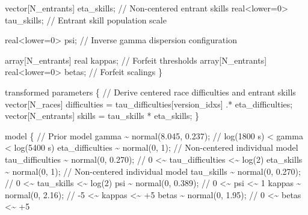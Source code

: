 \documentclass[
  letterpaper,
  DIV=11,
  numbers=noendperiod]{scrartcl}
\newenvironment{Shaded}{\begin{snugshade}}{\end{snugshade}}
\newcommand{\CommentTok}[1]{\textcolor[rgb]{0.37,0.37,0.37}{#1}}
\newcommand{\DataTypeTok}[1]{\textcolor[rgb]{0.68,0.00,0.00}{#1}}
\newcommand{\DecValTok}[1]{\textcolor[rgb]{0.68,0.00,0.00}{#1}}
\newcommand{\FloatTok}[1]{\textcolor[rgb]{0.68,0.00,0.00}{#1}}
\newcommand{\KeywordTok}[1]{\textcolor[rgb]{0.00,0.23,0.31}{#1}}
\newcommand{\NormalTok}[1]{\textcolor[rgb]{0.00,0.23,0.31}{#1}}
\begin{document}
\begin{codelisting}
\begin{Shaded}
\begin{Highlighting}[]
  \DataTypeTok{vector}\NormalTok{[N\_entrants] eta\_skills;    }\CommentTok{// Non{-}centered entrant skills}
  \DataTypeTok{real}\NormalTok{\textless{}}\KeywordTok{lower}\NormalTok{=}\DecValTok{0}\NormalTok{\textgreater{} tau\_skills;         }\CommentTok{// Entrant skill population scale}

  \DataTypeTok{real}\NormalTok{\textless{}}\KeywordTok{lower}\NormalTok{=}\DecValTok{0}\NormalTok{\textgreater{} psi;                }\CommentTok{// Inverse gamma dispersion configuration}

  \DataTypeTok{array}\NormalTok{[N\_entrants] }\DataTypeTok{real}\NormalTok{ kappas;         }\CommentTok{// Forfeit thresholds}
  \DataTypeTok{array}\NormalTok{[N\_entrants] }\DataTypeTok{real}\NormalTok{\textless{}}\KeywordTok{lower}\NormalTok{=}\DecValTok{0}\NormalTok{\textgreater{} betas; }\CommentTok{// Forfeit scalings}
\NormalTok{\}}

\KeywordTok{transformed parameters}\NormalTok{ \{}
  \CommentTok{// Derive centered race difficulties and entrant skills}
  \DataTypeTok{vector}\NormalTok{[N\_races] difficulties}
\NormalTok{    = tau\_difficulties[version\_idxs] .* eta\_difficulties;}
  \DataTypeTok{vector}\NormalTok{[N\_entrants] skills}
\NormalTok{    = tau\_skills * eta\_skills;}
\NormalTok{\}}

\KeywordTok{model}\NormalTok{ \{}
  \CommentTok{// Prior model}
\NormalTok{  gamma \textasciitilde{} normal(}\FloatTok{8.045}\NormalTok{, }\FloatTok{0.237}\NormalTok{); }\CommentTok{// log(1800 s) \textless{} gamma \textless{} log(5400 s)}
\NormalTok{  eta\_difficulties \textasciitilde{} normal(}\DecValTok{0}\NormalTok{, }\DecValTok{1}\NormalTok{);     }\CommentTok{// Non{-}centered individual model}
\NormalTok{  tau\_difficulties \textasciitilde{} normal(}\DecValTok{0}\NormalTok{, }\FloatTok{0.270}\NormalTok{); }\CommentTok{// 0 \textless{}\textasciitilde{} tau\_difficulties \textless{}\textasciitilde{} log(2)}
\NormalTok{  eta\_skills \textasciitilde{} normal(}\DecValTok{0}\NormalTok{, }\DecValTok{1}\NormalTok{);           }\CommentTok{// Non{-}centered individual model}
\NormalTok{  tau\_skills \textasciitilde{} normal(}\DecValTok{0}\NormalTok{, }\FloatTok{0.270}\NormalTok{);       }\CommentTok{// 0 \textless{}\textasciitilde{}    tau\_skills    \textless{}\textasciitilde{} log(2)}
\NormalTok{  psi \textasciitilde{} normal(}\DecValTok{0}\NormalTok{, }\FloatTok{0.389}\NormalTok{);       }\CommentTok{// 0 \textless{}\textasciitilde{} psi \textless{}\textasciitilde{} 1}
\NormalTok{  kappas \textasciitilde{} normal(}\DecValTok{0}\NormalTok{, }\FloatTok{2.16}\NormalTok{);     }\CommentTok{// {-}5 \textless{}\textasciitilde{} kappas \textless{}\textasciitilde{} +5}
\NormalTok{  betas \textasciitilde{} normal(}\DecValTok{0}\NormalTok{, }\FloatTok{1.95}\NormalTok{);      }\CommentTok{// 0 \textless{}\textasciitilde{} betas \textless{}\textasciitilde{} +5}


\end{Highlighting}
\end{Shaded}
\end{codelisting}
\end{document}
